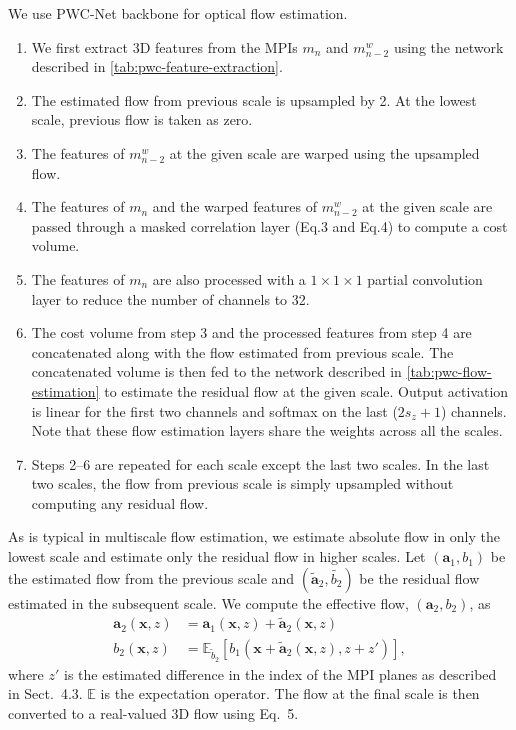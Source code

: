 \documentclass[preprint]{vgtc}
\begin{document}
    We use PWC-Net backbone for optical flow estimation.
    \begin{enumerate}
        \item We first extract 3D features from the MPIs $m_n$ and $m^w_{n-2}$ using the network described in \autoref{tab:pwc-feature-extraction}.
        \item The estimated flow from previous scale is upsampled by 2.
        At the lowest scale, previous flow is taken as zero.
        \item The features of $m^w_{n-2}$ at the given scale are warped using the upsampled flow.
        \item The features of $m_n$ and the warped features of $m^w_{n-2}$ at the given scale are passed through a masked correlation layer (Eq.3 and Eq.4) to compute a cost volume.
        \item The features of $m_n$ are also processed with a $1 \times 1 \times 1$ partial convolution layer to reduce the number of channels to 32.
        \item The cost volume from step 3 and the processed features from step 4 are concatenated along with the flow estimated from previous scale.
        The concatenated volume is then fed to the network described in \autoref{tab:pwc-flow-estimation} to estimate the residual flow at the given scale.
        Output activation is linear for the first two channels and softmax on the last ($2 s_z + 1$) channels.
        Note that these flow estimation layers share the weights across all the scales.
        \item Steps 2--6 are repeated for each scale except the last two scales.
        In the last two scales, the flow from previous scale is simply upsampled without computing any residual flow.
    \end{enumerate}

    As is typical in multiscale flow estimation, we estimate absolute flow in only the lowest scale and estimate only the residual flow in higher scales.
    Let $(\mathbf{a}_1, b_1)$ be the estimated flow from the previous scale and $(\tilde{\mathbf{a}}_2, \tilde{b_2})$ be the residual flow estimated in the subsequent scale.
We compute the effective flow, $(\mathbf{a}_2, b_2)$, as
    \begin{align}
        \mathbf{a}_2 \left( \mathbf{x}, z \right) &= \mathbf{a}_1 \left( \mathbf{x}, z \right) + \tilde{\mathbf{a}}_2 \left( \mathbf{x}, z \right) \\
        b_2 \left( \mathbf{x}, z \right) &= \mathbb{E}_{\tilde{b}_2} \left[ b_1 \left( \mathbf{x} + \tilde{\mathbf{a}}_2\left( \mathbf{x}, z \right), z + z' \right) \right],
    \end{align}
    where $z'$ is the estimated difference in the index of the MPI planes as described in Sect.\ 4.3.
    $\mathbb{E}$ is the expectation operator.
    The flow at the final scale is then converted to a real-valued 3D flow using Eq.\ 5.
\end{document}
